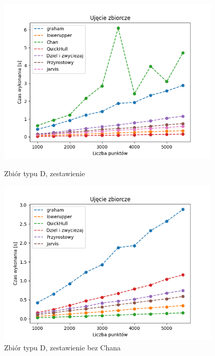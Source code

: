 \documentclass[11pt]{article}
\theoremstyle{remark} \newtheorem{definition}{def.}
\theoremstyle{definition} \newtheorem{twierdzenie}{tw.}
\begin{document}
\begin{figure}[]
    \centering
    \begin{minipage}{0.5\textwidth}
        \centering
        \includegraphics[width=0.95\textwidth]{../tests/kw-zbiorczy.png} %
        \caption{Zbiór typu D, zestawienie}
        \label{fig:kw-zbiorczy}
    \end{minipage}\hfill
    \begin{minipage}{0.5\textwidth}
        \centering
        \includegraphics[width=0.95\textwidth]{../tests/kw-zbiorczy-2.png} %
        \caption{Zbiór typu D, zestawienie bez Chana}
        \label{fig:kw-zbiorczy-2}
    \end{minipage}
\end{figure}
\end{document}
